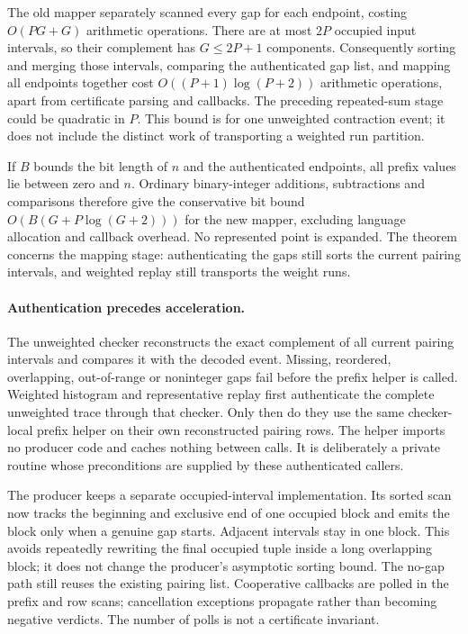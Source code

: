 The old mapper separately scanned every gap for each endpoint, costing
$O(PG+G)$ arithmetic operations. There are at most $2P$ occupied input
intervals, so their complement has $G\leq 2P+1$ components. Consequently
sorting and merging those intervals, comparing the authenticated gap list,
and mapping all endpoints together cost
$O((P+1)\log(P+2))$ arithmetic operations, apart from certificate parsing
and callbacks. The preceding repeated-sum stage could be quadratic in $P$.
This bound is for one unweighted contraction event; it does not include
the distinct work of transporting a weighted run partition.

If $B$ bounds the bit length of $n$ and
the authenticated endpoints, all prefix values lie between zero and $n$.
Ordinary binary-integer additions, subtractions and comparisons therefore
give the conservative bit bound
$O(B(G+P\log(G+2)))$ for the new mapper, excluding language allocation and
callback overhead. No represented point is expanded. The theorem concerns
the mapping stage: authenticating the gaps still sorts the current pairing
intervals, and weighted replay still transports the weight runs.

\paragraph{Authentication precedes acceleration.}
The unweighted checker reconstructs the exact complement of all current
pairing intervals and compares it with the decoded event. Missing,
reordered, overlapping, out-of-range or noninteger gaps fail before the
prefix helper is called. Weighted histogram and representative replay
first authenticate the complete unweighted trace through that checker.
Only then do they use the same checker-local prefix helper on their own
reconstructed pairing rows. The helper imports no producer code and caches
nothing between calls. It is deliberately a private routine whose
preconditions are supplied by these authenticated callers.

The producer keeps a separate occupied-interval implementation. Its sorted
scan now tracks the beginning and exclusive end of one occupied block and
emits the block only when a genuine gap starts. Adjacent intervals stay
in one block. This avoids repeatedly rewriting the final occupied tuple
inside a long overlapping block; it does not change the producer's
asymptotic sorting bound. The no-gap path still reuses the existing pairing
list. Cooperative callbacks are polled in the prefix and row scans;
cancellation exceptions propagate rather than becoming negative verdicts.
The number of polls is not a certificate invariant.

